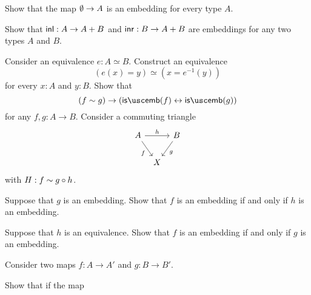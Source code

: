 \begin{exercises}
\exercise
  \begin{subexenum}
  \item \label{ex:is-emb-empty}Show that the map $\emptyset\to A$ is an embedding for every type $A$.
  \item \label{ex:is-emb-inl-inr}Show that ${\mathsf{inl}}:A\to A+B$ and ${\mathsf{inr}}:B\to A+B$ are embeddings for any two types $A$ and $B$.
  \end{subexenum}
\exercise Consider an equivalence $e:A\simeq B$. Construct an equivalence
  \begin{equation*}
    (e(x)=y)\simeq(x=e^{-1}(y))
  \end{equation*}
  for every $x:A$ and $y:B$.
\exercise Show that
\begin{equation*}
(f\htpy g)\to (\isemb(f)\leftrightarrow\isemb(g))
\end{equation*}
for any $f,g:A\to B$.
\exercise \label{ex:emb_triangle}Consider a commuting triangle
\begin{equation*}
\begin{tikzcd}[column sep=tiny]
A \arrow[rr,"h"] \arrow[dr,swap,"f"] & & B \arrow[dl,"g"] \\
& X
\end{tikzcd}
\end{equation*}
with $H:f\sim g\circ h$. 
\begin{subexenum}
\item Suppose that $g$ is an embedding. Show that $f$ is an embedding if and only if $h$ is an embedding.
\item Suppose that $h$ is an equivalence. Show that $f$ is an embedding if and only if $g$ is an embedding.
\end{subexenum}
\exercise \label{ex:is-equiv-is-equiv-functor-coprod}Consider two maps $f:A\to A'$ and $g:B \to B'$.
  \begin{subexenum}
  \item Show that if the map
    \begin{equation*}

\end{equation*}
\end{subexenum}
\end{exercises}
